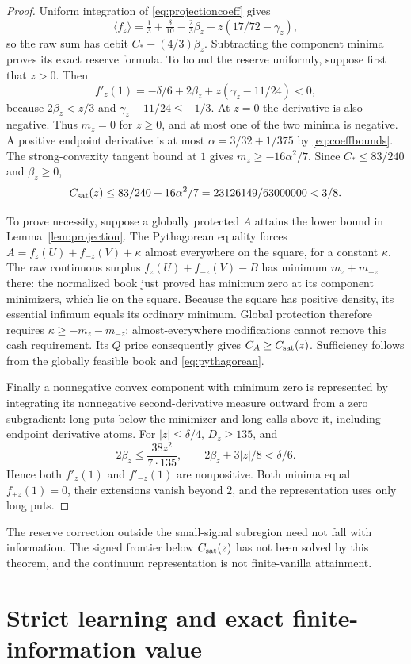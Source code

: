 \documentclass[11pt,a4paper]{amsart}
\theoremstyle{plain}
\theoremstyle{definition}
\theoremstyle{remark}
\newcommand{\br}[1]{\langle #1\rangle}
\begin{document}
\begin{proof}
Uniform integration of \eqref{eq:projectioncoeff} gives
\[
 \br{f_z}=\tfrac13+\tfrac\delta{10}-\tfrac23\beta_z
               +z(17/72-\gamma_z),
\]
so the raw sum has debit $C_*-(4/3)\beta_z$. Subtracting the component minima proves its exact reserve formula. To bound the reserve uniformly, suppose first that $z>0$. Then
\[
 f'_z(1)=-\delta/6+2\beta_z+z(\gamma_z-11/24)<0,
\]
because $2\beta_z<z/3$ and $\gamma_z-11/24\le-1/3$. At $z=0$ the derivative is also negative. Thus $m_z=0$ for $z\ge0$, and at most one of the two minima is negative. A positive endpoint derivative is at most
$\alpha=3/32+1/375$ by \eqref{eq:coeffbounds}. The strong-convexity tangent bound at $1$ gives
$m_z\ge-16\alpha^2/7$. Since $C_*\le83/240$ and $\beta_z\ge0$,
\[
 C_{\rm sat}(z)\le83/240+16\alpha^2/7
 =23126149/63000000<3/8.
\]

To prove necessity, suppose a globally protected $A$ attains the lower bound in Lemma~\ref{lem:projection}. The Pythagorean equality forces $A=f_z(U)+f_{-z}(V)+\kappa$ almost everywhere on the square, for a constant $\kappa$. The raw continuous surplus $f_z(U)+f_{-z}(V)-B$ has minimum $m_z+m_{-z}$ there: the normalized book just proved has minimum zero at its component minimizers, which lie on the square. Because the square has positive density, its essential infimum equals its ordinary minimum. Global protection therefore requires $\kappa\ge-m_z-m_{-z}$; almost-everywhere modifications cannot remove this cash requirement. Its $Q$ price consequently gives $C_A\ge C_{\rm sat}(z)$. Sufficiency follows from the globally feasible book and \eqref{eq:pythagorean}.

Finally a nonnegative convex component with minimum zero is represented by integrating its nonnegative second-derivative measure outward from a zero subgradient: long puts below the minimizer and long calls above it, including endpoint derivative atoms. For $|z|\le\delta/4$, $D_z\ge135$, and
\[
 2\beta_z\le\frac{38z^2}{7\cdot135},\qquad
 2\beta_z+3|z|/8<\delta/6.
\]
Hence both $f'_z(1)$ and $f'_{-z}(1)$ are nonpositive. Both minima equal $f_{\pm z}(1)=0$, their extensions vanish beyond $2$, and the representation uses only long puts.
\end{proof}
The reserve correction outside the small-signal subregion need not fall with information. The signed frontier below $C_{\rm sat}(z)$ has not been solved by this theorem, and the continuum representation is not finite-vanilla attainment.

\section{Strict learning and exact finite-information value}\label{sec:learning}
\end{document}

